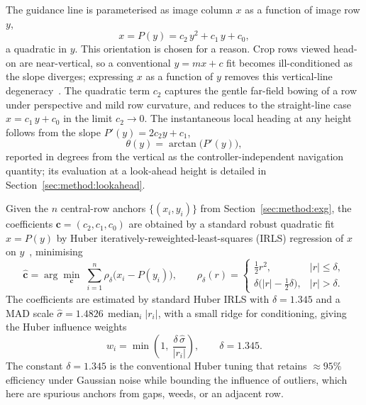 \noindent The guidance line is parameterised as image column $x$ as a function of image row $y$,
\begin{equation}
\label{eq:curve}
x = P(y) = c_2\,y^2 + c_1\,y + c_0 ,
\end{equation}
a quadratic in $y$. This orientation is chosen for a reason. Crop rows viewed head-on are near-vertical,
so a conventional $y=mx+c$ fit becomes ill-conditioned as the slope diverges; expressing $x$ as a function
of $y$ removes this vertical-line degeneracy~\cite{sogaard}. The quadratic term $c_2$ captures the gentle
far-field bowing of a row under perspective and mild row curvature, and reduces to the
straight-line case $x = c_1\,y + c_0$ in the limit $c_2\!\to\!0$. The instantaneous local heading at any height
follows from the slope $P'(y)=2c_2 y + c_1$,
\begin{equation}
\label{eq:heading}
\theta(y) = \arctan\!\bigl(P'(y)\bigr),
\end{equation}
reported in degrees from the vertical as the controller-independent navigation quantity; its evaluation at
a look-ahead height is detailed in Section~\ref{sec:method:lookahead}.

Given the $n$ central-row anchors $\{(x_i,y_i)\}$ from Section~\ref{sec:method:exg}, the coefficients
$\mathbf{c}=(c_2,c_1,c_0)$ are obtained by a standard robust quadratic fit $x=P(y)$ by Huber
iteratively-reweighted-least-squares (IRLS) regression of $x$ on $y$~\cite{huber1964}, minimising
\begin{equation}
\label{eq:irls_obj}
\hat{\mathbf{c}} = \arg\min_{\mathbf{c}}\; \sum_{i=1}^{n} \rho_\delta\!\bigl(x_i - P(y_i)\bigr),
\qquad
\rho_\delta(r) =
\begin{cases}
\tfrac{1}{2}r^2, & |r|\le\delta,\\[2pt]
\delta\bigl(|r|-\tfrac{1}{2}\delta\bigr), & |r|>\delta.
\end{cases}
\end{equation}
The coefficients are estimated by standard Huber IRLS with $\delta = 1.345$ and a MAD scale
$\hat\sigma = 1.4826\,\operatorname{median}_i|r_i|$, with a small ridge for conditioning, giving the Huber
influence weights
\begin{equation}
\label{eq:huber_w}
w_i = \min\!\left(1,\ \frac{\delta\,\hat\sigma}{|r_i|}\right),
\qquad \delta = 1.345.
\end{equation}
The constant $\delta=1.345$ is the conventional Huber tuning that retains
$\approx95\%$ efficiency under Gaussian noise while bounding the influence of outliers, which here are
spurious anchors from gaps, weeds, or an adjacent row.

